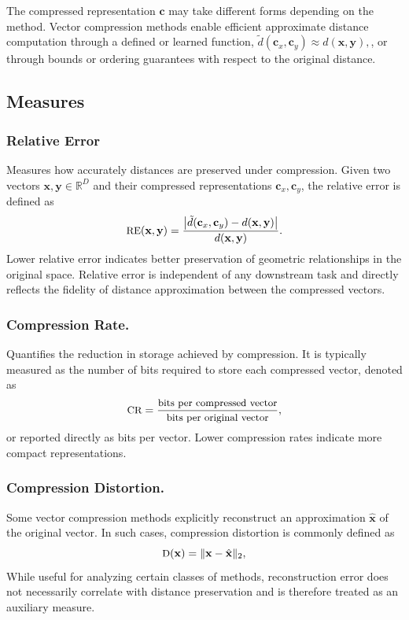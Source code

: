 \documentclass[sigconf]{acmart}
\begin{document}
The compressed representation $\mathbf{c}$ may take different forms depending on the method. 
Vector compression methods enable efficient approximate distance computation through a defined or learned function, \(\tilde{d}(\mathbf{c}_x, \mathbf{c}_y) \approx d(\mathbf{x}, \mathbf{y}), \), or through bounds or ordering guarantees with respect to the original distance.



\subsection{Measures}
\subsubsection{Relative Error} Measures how accurately distances are preserved under compression.
Given two vectors $\mathbf{x}, \mathbf{y} \in \mathbb{R}^D$ and their compressed
representations $\mathbf{c}_x, \mathbf{c}_y$, the relative error is defined as
\[\small
\text{RE}(\mathbf{x}, \mathbf{y}) =
\frac{\left| \tilde{d}(\mathbf{c}_x, \mathbf{c}_y) - d(\mathbf{x}, \mathbf{y}) \right|}
{d(\mathbf{x}, \mathbf{y})}.
\]
Lower relative error indicates better preservation of geometric relationships in the original space. 
Relative error is independent of any downstream task and directly reflects the fidelity of distance approximation between the compressed vectors.

\subsubsection{Compression Rate.}
Quantifies the reduction in storage achieved by compression. It is typically measured as the number of bits required to store each compressed vector, denoted as
\[\small
\text{CR} = \frac{\text{bits per compressed vector}}{\text{bits per original vector}},
\] 
or reported directly as bits per vector. Lower compression rates indicate more compact representations.

\subsubsection{Compression Distortion.} Some vector compression methods explicitly reconstruct an approximation $\hat{\mathbf{x}}$ of the original vector. 
In such cases, compression distortion is commonly defined as
\[\small
\text{D}(\mathbf{x}) = \|\mathbf{x} - \hat{\mathbf{x}}\|_2,
\]
While useful for analyzing certain classes of methods, reconstruction error does not necessarily correlate with distance preservation and is therefore treated as an auxiliary measure.
\end{document}
